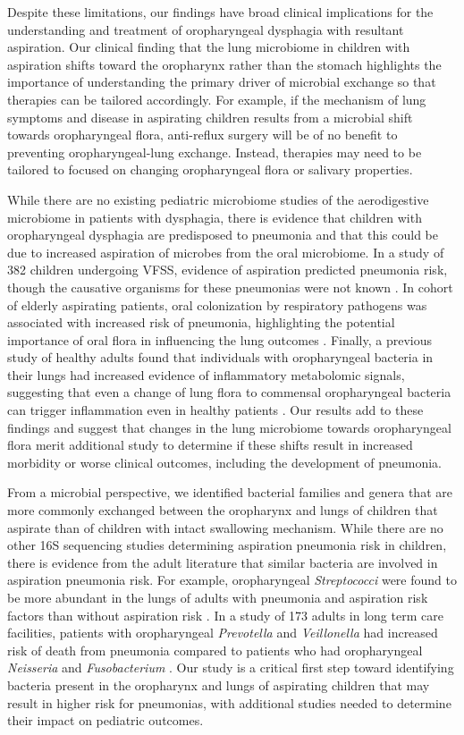 \documentclass{article}
\begin{document}
Despite these limitations, our findings have broad clinical implications for the understanding and treatment of oropharyngeal dysphagia with resultant aspiration.
Our clinical finding that the lung microbiome in children with aspiration shifts toward the oropharynx rather than the stomach highlights the importance of understanding the primary driver of microbial exchange so that therapies can be tailored accordingly. 
For example, if the mechanism of lung symptoms and disease in aspirating children results from a microbial shift towards oropharyngeal flora, anti-reflux surgery will be of no benefit to preventing oropharyngeal-lung exchange. 
Instead, therapies may need to be tailored to focused on changing oropharyngeal flora or salivary properties.

While there are no existing pediatric microbiome studies of the aerodigestive microbiome in patients with dysphagia, there is evidence that children with oropharyngeal dysphagia are predisposed to pneumonia and that this could be due to increased aspiration of microbes from the oral microbiome. 
In a study of 382 children undergoing VFSS, evidence of aspiration predicted pneumonia risk, though the causative organisms for these pneumonias were not known \cite{weir2007pneumoasp}.
In cohort of elderly aspirating patients, oral colonization by respiratory pathogens was associated with increased risk of pneumonia, highlighting the potential importance of oral flora in influencing the lung outcomes \cite{ortega2015oralpatho}.
Finally, a previous study of healthy adults found that individuals with oropharyngeal bacteria in their lungs had increased evidence of inflammatory metabolomic signals, suggesting that even a change of lung flora to commensal oropharyngeal bacteria can trigger inflammation even in healthy patients \cite{segal-2016-inflammation}. 
Our results add to these findings and suggest that changes in the lung microbiome towards oropharyngeal flora merit additional study to determine if these shifts result in increased morbidity or worse clinical outcomes, including the development of pneumonia. 

From a microbial perspective, we identified bacterial families and genera that are more commonly exchanged between the oropharynx and lungs of children that aspirate than of children with intact swallowing mechanism.
While there are no other 16S sequencing studies determining aspiration pneumonia risk in children, there is evidence from the adult literature that similar bacteria are involved in aspiration pneumonia risk.
For example, oropharyngeal \textit{Streptococci} were found to be more abundant in the lungs of adults with pneumonia and aspiration risk factors than without aspiration risk \cite{akata2016oralstrepto}.
In a study of 173 adults in long term care facilities, patients with oropharyngeal \textit{Prevotella} and \textit{Veillonella} had increased risk of death from pneumonia compared to patients who had oropharyngeal \textit{Neisseria} and \textit{Fusobacterium} \cite{kageyama2017pneumomortality}. 
Our study is a critical first step toward identifying bacteria present in the oropharynx and lungs of aspirating children that may result in higher risk for pneumonias, with additional studies needed to determine their impact on pediatric outcomes.
\end{document}
